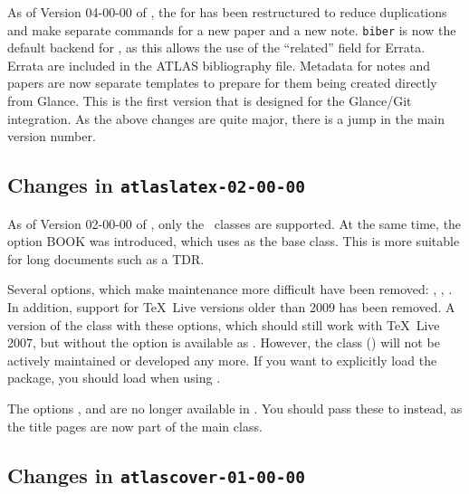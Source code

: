 As of Version 04-00-00 of , the  for 
has been restructured to reduce duplications and make separate commands for a new paper and a new note.
\texttt{biber} is now the default backend for ,
as this allows the use of the \enquote{related} field for Errata.
Errata are included in the ATLAS bibliography file.
Metadata for notes and papers are now separate templates to prepare for them being created directly from Glance.
This is the first version that is designed for the Glance/Git integration.
As the above changes are quite major, there is a jump in the main version number.


\subsection{Changes in \texttt{atlaslatex-02-00-00}}
\label{sec:atlaslatex2}

As of Version 02-00-00 of , only the \KOMAScript\ classes are supported.
At the same time, the option BOOK was introduced, which uses  as the base class.
This is more suitable for long documents such as a TDR.

Several options, which make maintenance more difficult have been removed:
, , .
In addition, support for \TeX\ Live versions older than 2009 has been removed.
A version of the class with these options, which should still work with \TeX\ Live 2007,
but without the  option is available as .
However, the class () will not be actively maintained or developed any more.
If you want to explicitly load the  package,
you should load  when using .

The options ,  and  are no longer available
in .
You should pass these to  instead, as the title pages are now part of the main class.


\subsection{Changes in \texttt{atlascover-01-00-00}}
\label{sec:oldcover}

